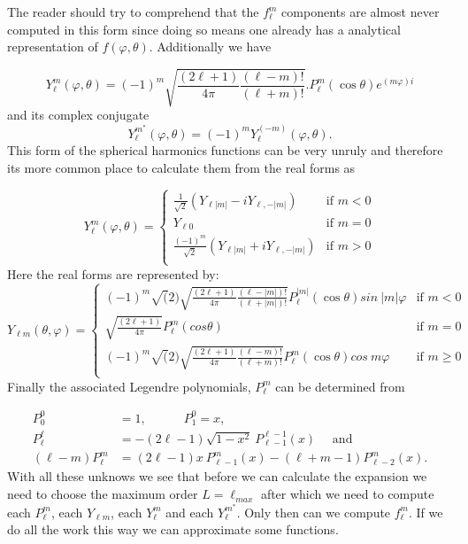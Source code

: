 \documentclass[11pt,letterpaper,titlepage]{article}
\newcommand{\beqn}{\begin{equation}
	\begin{aligned}}
\newcommand{\eeqn}{\end{aligned}
	\end{equation}}
\numberwithin{equation}{section}
\begin{document}
\begin{appendices}
The reader should try to comprehend that the $f_{\ell}^m$ components are almost never computed in this form since doing so means one already has a analytical representation of $f(\varphi,\theta)$. Additionally we have

\begin{equation}
Y_{\ell}^m (\varphi,\theta)= 
(-1)^m \sqrt{
\frac{(2\ell+1)}{4\pi}
\frac{(\ell-m)!}{(\ell+m)!}
}
.P_{\ell}^m (\cos \theta)e^{ (m \varphi)i}
\end{equation}
and its complex conjugate
$$Y_{\ell }^{m^*}(\varphi,\theta) = (-1)^mY_{\ell }^{(-m)}(\varphi,\theta).$$
This form of the spherical harmonics functions can be very unruly and therefore its more common place to calculate them from the real forms as

\begin{equation}
Y_{\ell}^m (\varphi,\theta)=
\begin{cases}
\frac{1}{\sqrt{2}} (Y_{\ell |m|}- i Y_{\ell,-|m|}) & \text{if }m<0 \\
Y_{\ell0} & \text{if } m=0 \\
\frac{(-1)^m}{\sqrt{2}} (Y_{\ell |m|}+ i Y_{\ell,-|m|}) & \text{if }m>0 \\
\end{cases}
\end{equation}
Here the real forms are represented by:
\begin{equation}\label{eq:Ylm}
Y_{\ell m} (\theta, \varphi )=
\begin{cases}
(-1)^m \sqrt(2)\sqrt{ \frac{(2\ell + 1)}{4\pi}   \frac{(\ell-|m|)!}{(\ell+|m|)!}}P_{\ell}^{|m|}(\cos\theta)sin\ {|m|\varphi}
& \text{if } m < 0 \\
\sqrt{ \frac{(2\ell + 1)}{4\pi}} P_{\ell}^{m}(cos\theta) & \text{if } m = 0 \\
(-1)^m \sqrt(2)\sqrt{ \frac{(2\ell + 1)}{4\pi}   \frac{(\ell-m)!}{(\ell+m)!}}P_{\ell}^{m}(\cos\theta)cos\ {m\varphi}
& \text{if } m \ge 0 \\
\end{cases}
\end{equation}
\newline
Finally the associated Legendre polynomials, $P_\ell^m$ can be determined from

\beqn 
P_0^0 &= 1, \quad \quad \quad
P_1^{0} = x, \\
P_\ell^\ell &= - (2\ell-1) \sqrt{1-x^2} \ P_{\ell-1}^{\ell-1}(x) \quad \text{ and}\\
(\ell - m)
P_\ell^m &= (2\ell-1)x \ P_{\ell-1}^m(x) - (\ell+m -1)P_{\ell-2}^m (x).
\eeqn
\newline
With all these unknows we see that before we can calculate the expansion we need to choose the maximum order $L=\ell_{max}$ after which we need to compute each $P_\ell^m$, each $Y_{\ell m}$, each $Y_{\ell}^m$ and each $Y_\ell^{m^*}$. Only then can we compute $f_{\ell}^m$. If we do all the work this way we can approximate some functions.


\end{appendices}
\end{document}
